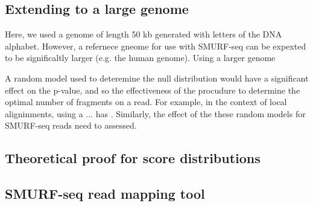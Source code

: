 \subsection*{Extending to a large genome}
Here, we used a genome of length 50 kb generated with letters of the DNA
alphabet. However, a refernece gneome for use with SMURF-seq can be
expexted to be significaltly larger (e.g. the human genome). Using a
larger genome  

A random model used to deteremine the null distribution would have a
significant effect on the p-value, and so the effectiveness of the
procudure to determine the optimal number of fragments on a read. For
example, in the context of local aligninments, using a  ... has .
Similarly, the effect of the these random models for SMURF-seq reads
need to assessed.  




\subsection*{Theoretical proof for score distributions}


\subsection*{SMURF-seq read mapping tool}


